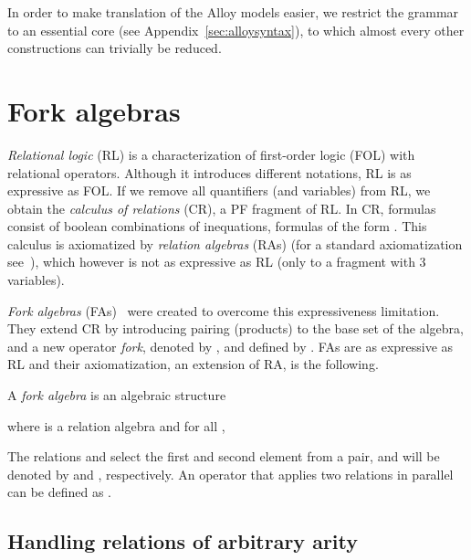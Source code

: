 \documentclass{llncs}
\begin{document}
In order to make translation of the Alloy models easier, we restrict
the grammar to an essential core (see Appendix~\ref{sec:alloysyntax}), to
which almost every other constructions can trivially be reduced.

\section{Fork algebras}
\label{sec:fork}
\emph{Relational logic} (RL) is a characterization of first-order logic (FOL) with relational operators. Although it introduces different notations, RL is as expressive as FOL. If we remove all quantifiers (and variables) from RL, we obtain the \emph{calculus of relations} (CR), a PF fragment of RL. In CR, formulas consist of boolean combinations of inequations, formulas of the form . This calculus is axiomatized by \emph{relation algebras} (RAs) (for a standard axiomatization see~\cite{maddux}), which however is not as expressive as RL (only to a fragment with 3 variables).

\emph{Fork algebras} (FAs)~\cite{forkb} were created to overcome this
expressiveness limitation. They extend CR by introducing pairing
(products) to the base set of the algebra, and a new operator
\emph{fork}, denoted by , and defined by .
FAs are as expressive as RL and their axiomatization, an extension of RA, is the following.

\begin{definition}
A \emph{fork algebra} is an algebraic structure 

where  is a relation algebra and for all ,

\label{def:afa}
\end{definition}
The relations  and  select
the first and second element from a pair, and will be denoted by
 and , respectively. An operator  that applies
two relations in parallel can be defined as .


\subsection{Handling relations of arbitrary arity}
\label{sec:nary}
\end{document}
